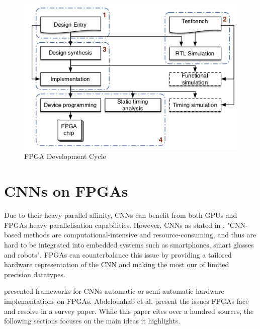 \begin{figure}[htbp]
	\centering
		\includegraphics[width=\textwidth]{Figures/FPGACycle.png}
	\caption[FPGA Development Cycle]{FPGA Development Cycle \cite{XuanSang2014}}
	\label{fig:FPGACycle}
\end{figure}


\section{CNNs on FPGAs}

Due to their heavy parallel affinity, CNNs can benefit from both GPUs \cite{Micikevicius2017, Jia2018, Kurth2018} and FPGAs \cite{Park2016, Liang2017, Colangelo2018, Jahanshahi2019, Bacchus2020} heavy parallelisation capabilities.
However, CNNs as stated in \cite{Jahanshahi2019}, "CNN-based methods are computational-intensive and resource-consuming, and thus are hard to be integrated into embedded systems such as smartphones, smart glasses and robots". FPGAs can counterbalance this issue by providing a tailored hardware representation of the CNN and making the most our of limited precision datatypes.

\cite{Zhao2016, Colangelo2018, Jahanshahi2019} presented frameworks for CNNs automatic or semi-automatic hardware implementations on FPGAs. Abdelouahab et al. \cite{Abdelouahab2018} present the issues FPGAs face and resolve in a survey paper. While this paper cites over a hundred sources, the following sections focuses on the main ideas it highlights.

